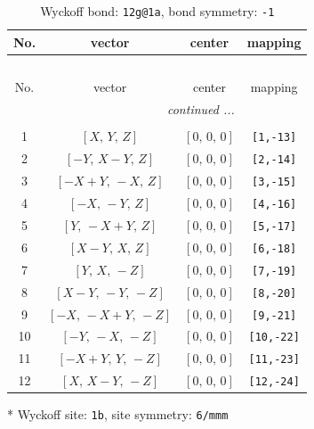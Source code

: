 \documentclass[fleqn,8pt]{jsarticle}
\begin{document}
\begin{longtable}{cccc}
\caption{Wyckoff bond: {\tt 12g@1a}, bond symmetry: {\tt -1}}
 \\
 \hline \hline
No. & vector & center & mapping \\ \hline \endfirsthead

\multicolumn{3}{l}{\tablename\ \thetable{}} \\
 \hline \hline
No. & vector & center & mapping \\ \hline \endhead

 \hline \hline
\multicolumn{3}{r}{\footnotesize\it continued ...} \\ \endfoot

 \hline \hline
\multicolumn{3}{r}{} \\ \endlastfoot

1 & $\left[ X,\, Y,\, Z \right]$ & $\left[ 0,\, 0,\, 0 \right]$ & {\tt [1,-13]} \\ \hline
2 & $\left[ - Y,\, X - Y,\, Z \right]$ & $\left[ 0,\, 0,\, 0 \right]$ & {\tt [2,-14]} \\ \hline
3 & $\left[ - X + Y,\, - X,\, Z \right]$ & $\left[ 0,\, 0,\, 0 \right]$ & {\tt [3,-15]} \\ \hline
4 & $\left[ - X,\, - Y,\, Z \right]$ & $\left[ 0,\, 0,\, 0 \right]$ & {\tt [4,-16]} \\ \hline
5 & $\left[ Y,\, - X + Y,\, Z \right]$ & $\left[ 0,\, 0,\, 0 \right]$ & {\tt [5,-17]} \\ \hline
6 & $\left[ X - Y,\, X,\, Z \right]$ & $\left[ 0,\, 0,\, 0 \right]$ & {\tt [6,-18]} \\ \hline
7 & $\left[ Y,\, X,\, - Z \right]$ & $\left[ 0,\, 0,\, 0 \right]$ & {\tt [7,-19]} \\ \hline
8 & $\left[ X - Y,\, - Y,\, - Z \right]$ & $\left[ 0,\, 0,\, 0 \right]$ & {\tt [8,-20]} \\ \hline
9 & $\left[ - X,\, - X + Y,\, - Z \right]$ & $\left[ 0,\, 0,\, 0 \right]$ & {\tt [9,-21]} \\ \hline
10 & $\left[ - Y,\, - X,\, - Z \right]$ & $\left[ 0,\, 0,\, 0 \right]$ & {\tt [10,-22]} \\ \hline
11 & $\left[ - X + Y,\, Y,\, - Z \right]$ & $\left[ 0,\, 0,\, 0 \right]$ & {\tt [11,-23]} \\ \hline
12 & $\left[ X,\, X - Y,\, - Z \right]$ & $\left[ 0,\, 0,\, 0 \right]$ & {\tt [12,-24]} \\
\end{longtable}
* Wyckoff site: {\tt 1b}, site symmetry: {\tt 6/mmm}
\renewcommand{\arraystretch}{1.2}
\end{document}
